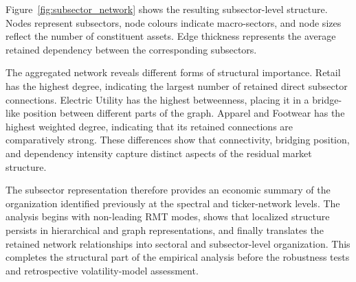 Figure~\ref{fig:subsector_network} shows the resulting subsector-level structure. Nodes represent subsectors, node colours indicate macro-sectors, and node sizes reflect the number of constituent assets. Edge thickness represents the average retained dependency between the corresponding subsectors.

The aggregated network reveals different forms of structural importance. Retail has the highest degree, indicating the largest number of retained direct subsector connections. Electric Utility has the highest betweenness, placing it in a bridge-like position between different parts of the graph. Apparel and Footwear has the highest weighted degree, indicating that its retained connections are comparatively strong. These differences show that connectivity, bridging position, and dependency intensity capture distinct aspects of the residual market structure.

The subsector representation therefore provides an economic summary of the organization identified previously at the spectral and ticker-network levels. The analysis begins with non-leading RMT modes, shows that localized structure persists in hierarchical and graph representations, and finally translates the retained network relationships into sectoral and subsector-level organization. This completes the structural part of the empirical analysis before the robustness tests and retrospective volatility-model assessment.
